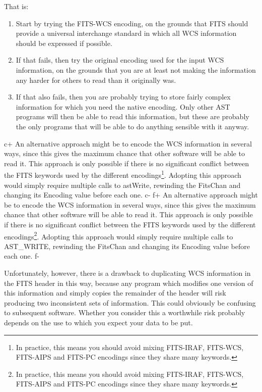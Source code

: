 \documentclass[twoside,11pt]{article}
\begin{document}
That is:

\begin{enumerate}
\item Start by trying the FITS-WCS encoding, on the grounds that FITS
should provide a universal interchange standard in which all WCS
information should be expressed if possible. 

\item If that fails, then try the original encoding used for the input
WCS information, on the grounds that you are at least not making the
information any harder for others to read than it originally was.

\item If that also fails, then you are probably trying to store fairly
complex information for which you need the native encoding. Only other
AST programs will then be able to read this information, but these are
probably the only programs that will be able to do anything sensible
with it anyway.
\end{enumerate}

c+
An alternative approach might be to encode the WCS information in several
ways, since this gives the maximum chance that other software will be
able to read it. This approach is only possible if there is no
significant conflict between the FITS keywords used by the different
encodings\footnote{In practice, this means you should avoid mixing
FITS-IRAF, FITS-WCS, FITS-AIPS and FITS-PC encodings since they share
many keywords.}.  Adopting this approach would simply require multiple
calls to astWrite, rewinding the FitsChan and changing its Encoding value
before each one.
c-
f+
An alternative approach might be to encode the WCS information in several
ways, since this gives the maximum chance that other software will be
able to read it. This approach is only possible if there is no
significant conflict between the FITS keywords used by the different
encodings\footnote{In practice, this means you should avoid mixing
FITS-IRAF, FITS-WCS, FITS-AIPS and FITS-PC encodings since they share
many keywords.}.  Adopting this approach would simply require multiple
calls to AST\_WRITE, rewinding the FitsChan and changing its Encoding value
before each one.
f-

Unfortunately, however, there is a drawback to duplicating WCS
information in the FITS header in this way, because any program which
modifies one version of this information and simply copies the
remainder of the header will risk producing two inconsistent sets of
information. This could obviously be confusing to subsequent
software. Whether you consider this a worthwhile risk probably depends
on the use to which you expect your data to be put.
\end{document}
